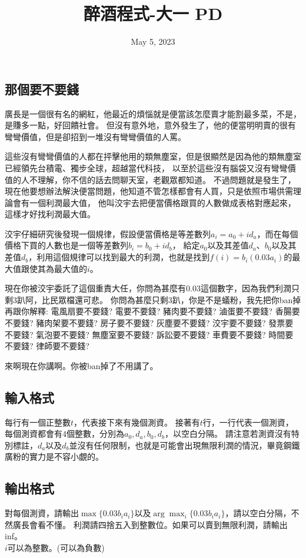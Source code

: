\documentclass{article}
\title{醉酒程式-大一 PD}
\date{May 5, 2023}
\begin{document}
\begin{CJK*}{UTF8}{bsmi}

\maketitle

\section*{那個要不要錢}
廣長是一個很有名的網紅，他最近的煩惱就是便當該怎麼賣才能割最多菜，不是，是賺多一點，好回饋社會。
但沒有意外地，意外發生了，他的便當明明賣的很有彎彎價值，但是卻招到一堆沒有彎彎價值的人罵。

這些沒有彎彎價值的人都在抨擊他用的類無塵室，但是很顯然是因為他的類無塵室已經領先台積電、獨步全球，超越當代科技，
以至於這些沒有腦袋又沒有彎彎價值的人不理解，你不信的話去問聊天室，老觀眾都知道。
不過問題就是發生了，現在他要想辦法解決便當問題，他知道不管怎樣都會有人買，只是依照市場供需理論會有一個利潤最大值，
他叫洨宇去把便當價格跟買的人數做成表格對應起來，這樣才好找利潤最大值。

洨宇仔細研究後發現一個規律，假設便當價格是等差數列$a_i=a_0+id_a$，而在每個價格下買的人數也是一個等差數列$b_i=b_0+id_b$，
給定$a_0$以及其差值$d_a$、$b_0$以及其差值$d_b$，利用這個規律可以找到最大的利潤，也就是找到$f(i)=b_i(0.03a_i)$的最大值跟使其為最大值的$i$。

現在你被洨宇委託了這個重責大任，你問為甚麼有$0.03$這個數字，因為我們利潤只剩$3$趴阿，比民眾檔還可悲。
你問為甚麼只剩$3$趴，你是不是蟻粉，我先把你ban掉再跟你解釋:
電風扇要不要錢? 電要不要錢? 豬肉要不要錢? 滷蛋要不要錢? 香腸要不要錢? 豬肉架要不要錢? 房子要不要錢? 灰塵要不要錢? 
洨宇要不要錢? 發票要不要錢? 氣泡要不要錢? 無塵室要不要錢? 訴訟要不要錢? 車費要不要錢? 時間要不要錢? 律師要不要錢?

來啊現在你講啊。你被ban掉了不用講了。

\subsection*{輸入格式}
每行有一個正整數$t$，代表接下來有幾個測資。
接著有$t$行，一行代表一個測資，每個測資都會有$4$個整數，分別為$a_0,d_a,b_0,d_b$，以空白分隔。
請注意若測資沒有特別標註，$d_a$以及$d_b$並沒有任何限制，也就是可能會出現無限利潤的情況，畢竟鋼鐵廣粉的實力是不容小覷的。

\subsection*{輸出格式}
對每個測資，請輸出$\max\{0.03b_ia_i\}$以及$\arg\max_i\{0.03b_ia_i\}$，請以空白分隔，不然廣長會看不懂。
利潤請四捨五入到整數位。如果可以賣到無限利潤，請輸出inf。\\
$i$可以為整數。(可以為負數)


\end{CJK*}
\end{document}
